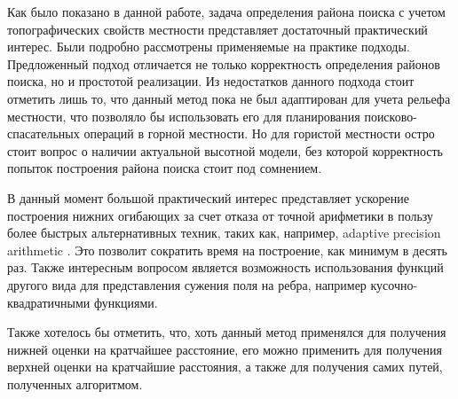 \startconclusionpage

Как было показано в данной работе, задача определения района поиска
с учетом топографических свойств местности представляет
достаточный практический интерес. Были подробно рассмотрены применяемые
на практике подходы. Предложенный подход отличается не только
корректность определения районов поиска, но и простотой реализации.
Из недостатков данного подхода стоит отметить лишь то, что данный метод
пока не был адаптирован для учета рельефа местности, что позволяло бы
использовать его для планирования поисково-спасательных операций в горной
местности. Но для гористой местности остро стоит вопрос о наличии актуальной
высотной модели, без которой корректность попыток построения
района поиска стоит под сомнением.

В данный момент большой практический интерес представляет ускорение
построения нижних огибающих за счет отказа от точной арифметики в пользу более
быстрых альтернативных техник, таких как, например, adaptive precision
arithmetic \cite{APREC}. Это позволит сократить время на построение, как минимум в
десять раз. Также интересным вопросом является возможность использования
функций другого вида для представления сужения поля на ребра, например
кусочно-квадратичными функциями.

Также хотелось бы отметить, что, хоть данный метод применялся для
получения нижней оценки на кратчайшее расстояние, его можно применить
для получения верхней оценки на кратчайшие расстояния, а также для получения
самих путей, полученных алгоритмом.

\FloatBarrier

